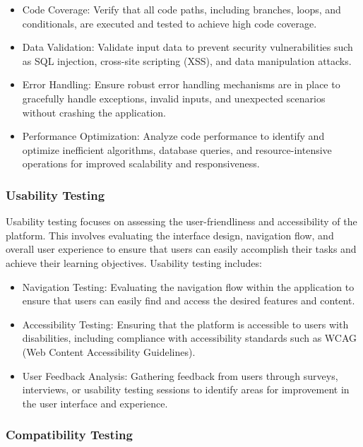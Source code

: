 		\begin{itemize}
			\item Code Coverage: Verify that all code paths, including branches, loops, and conditionals, are executed and tested to achieve high code coverage.
			\item Data Validation: Validate input data to prevent security vulnerabilities such as SQL injection, cross-site scripting (XSS), and data manipulation attacks.
			\item Error Handling: Ensure robust error handling mechanisms are in place to gracefully handle exceptions, invalid inputs, and unexpected scenarios without crashing the application.
			\item Performance Optimization: Analyze code performance to identify and optimize inefficient algorithms, database queries, and resource-intensive operations for improved scalability and responsiveness.
		\end{itemize}
		
		\subsubsection{Usability Testing}
		
		Usability testing focuses on assessing the user-friendliness and accessibility of the platform. This involves evaluating the interface design, navigation flow, and overall user experience to ensure that users can easily accomplish their tasks and achieve their learning objectives. Usability testing includes:
		
		\begin{itemize}
			\item Navigation Testing: Evaluating the navigation flow within the application to ensure that users can easily find and access the desired features and content.
			\item Accessibility Testing: Ensuring that the platform is accessible to users with disabilities, including compliance with accessibility standards such as WCAG (Web Content Accessibility Guidelines).
			\item User Feedback Analysis: Gathering feedback from users through surveys, interviews, or usability testing sessions to identify areas for improvement in the user interface and experience.
		\end{itemize}
		
		\subsubsection{Compatibility Testing}
		

